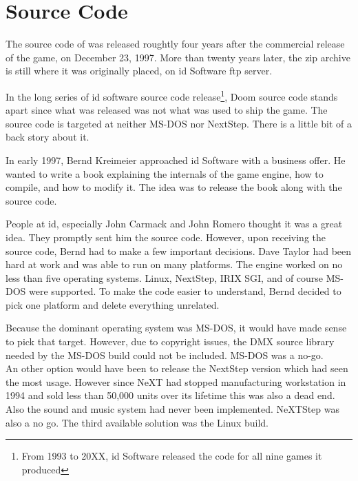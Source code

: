\section{Source Code}
The source code of \doom was released roughtly four years after the commercial release of the game, on December 23, 1997. More than twenty years later, the zip archive is still where it was originally placed, on id Software ftp server.\\
\par
{}
\par
 In the long series of id software source code release\footnote{From 1993 to 20XX, id Software released the code for all nine games it produced}, Doom source code stands apart since what was released was not what was used to ship the game. The source code is targeted at neither MS-DOS nor NextStep. There is a little bit of a back story about it.\\
 \par
 In early 1997, Bernd Kreimeier approached id Software with a business offer. He wanted to write a book explaining the internals of the game engine, how to compile, and how to modify it. The idea was to release the book along with the source code.\\
 \par
  People at id, especially John Carmack and John Romero thought it was a great idea. They promptly sent him the source code. However, upon receiving the source code, Bernd had to make a few important decisions. Dave Taylor had been hard at work and \doom was able to run on many platforms.  The engine worked on no less than five operating systems. Linux, NextStep, IRIX SGI, and of course MS-DOS were supported. To make the code easier to understand, Bernd decided to pick one platform and delete everything unrelated.\\
  \par
  Because the dominant operating system was MS-DOS, it would have made sense to pick that target. However, due to copyright issues, the DMX source library needed by the MS-DOS build could not be included. MS-DOS was a no-go.\\
   An other option would have been to release the NextStep version which had seen the most usage. However since NeXT had stopped manufacturing workstation in 1994 and sold less than 50,000 units over its lifetime this was also a dead end. Also the sound and music system had never been implemented. NeXTStep was also a no go. The third available solution was the Linux build.\\
